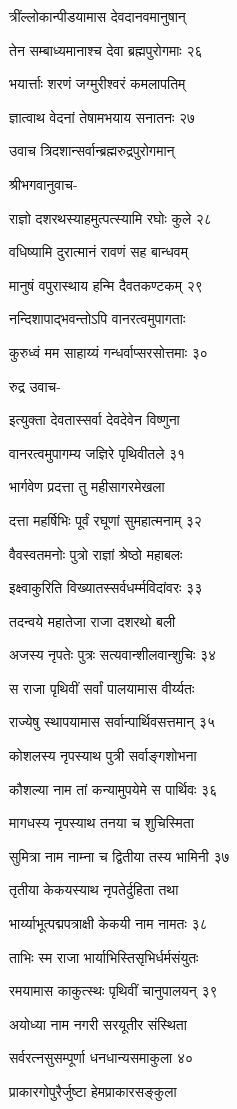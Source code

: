 त्रींल्लोकान्पीडयामास देवदानवमानुषान्

तेन सम्बाध्यमानाश्च देवा ब्रह्मपुरोगमाः २६

भयार्त्ताः शरणं जग्मुरीश्वरं कमलापतिम्

ज्ञात्वाथ वेदनां तेषामभयाय सनातनः २७

उवाच त्रिदशान्सर्वान्ब्रह्मरुद्रपुरोगमान्

श्रीभगवानुवाच-

राज्ञो दशरथस्याहमुत्पत्स्यामि रघोः कुले २८

वधिष्यामि दुरात्मानं रावणं सह बान्धवम्

मानुषं वपुरास्थाय हन्मि दैवतकण्टकम् २९

नन्दिशापाद्भवन्तोऽपि वानरत्वमुपागताः

कुरुध्वं मम साहाय्यं गन्धर्वाप्सरसोत्तमाः ३०

रुद्र उवाच-

इत्युक्ता देवतास्सर्वा देवदेवेन विष्णुना

वानरत्वमुपागम्य जज्ञिरे पृथिवीतले ३१

भार्गवेण प्रदत्ता तु महीसागरमेखला

दत्ता महर्षिभिः पूर्वं रघूणां सुमहात्मनाम् ३२

वैवस्वतमनोः पुत्रो राज्ञां श्रेष्ठो महाबलः

इक्ष्वाकुरिति विख्यातस्सर्वधर्म्मविदांवरः ३३

तदन्वये महातेजा राजा दशरथो बली

अजस्य नृपतेः पुत्रः सत्यवान्शीलवान्शुचिः ३४

स राजा पृथिवीं सर्वां पालयामास वीर्य्यतः

राज्येषु स्थापयामास सर्वान्पार्थिवसत्तमान् ३५

कोशलस्य नृपस्याथ पुत्री सर्वाङ्गशोभना

कौशल्या नाम तां कन्यामुपयेमे स पार्थिवः ३६

मागधस्य नृपस्याथ तनया च शुचिस्मिता

सुमित्रा नाम नाम्ना च द्वितीया तस्य भामिनी ३७

तृतीया केकयस्याथ नृपतेर्दुहिता तथा

भार्य्याभूत्पद्मपत्राक्षी केकयी नाम नामतः ३८

ताभिः स्म राजा भार्याभिस्तिसृभिर्धर्मसंयुतः

रमयामास काकुत्स्थः पृथिवीं चानुपालयन् ३९

अयोध्या नाम नगरी सरयूतीर संस्थिता

सर्वरत्नसुसम्पूर्णा धनधान्यसमाकुला ४०

प्राकारगोपुरैर्जुष्टा हेमप्राकारसङ्कुला

